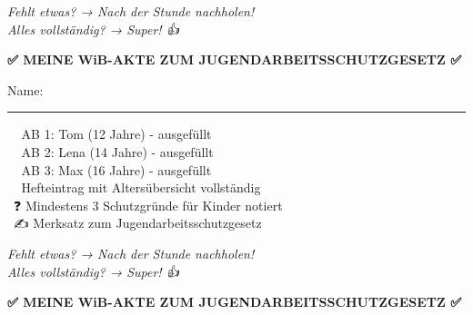 \documentclass[12pt, a4paper]{article}
\newcommand{\checkbox}{\framebox[1em]{\phantom{X}}}
\begin{document}
\begin{center}
\begin{minipage}{0.48\textwidth}
\begin{framed}
                \vspace{0.3cm}
                
                \textit{Fehlt etwas? → Nach der Stunde nachholen!}\\
                \textit{Alles vollständig? → Super! 👍}
            \end{framed}
        \end{minipage}
        
        \vspace{0.5cm}
        
        \begin{minipage}{0.48\textwidth}
            \begin{framed}
                \begin{center}
                    {\color{headercolor}\Large\textbf{✅ MEINE WiB-AKTE ZUM JUGENDARBEITSSCHUTZGESETZ ✅}}
                \end{center}
                
                Name: \rule{8cm}{0.4pt}
                
                \vspace{0.3cm}
                
                \checkbox\ 📄 AB 1: Tom (12 Jahre) - ausgefüllt\\
                \checkbox\ 📄 AB 2: Lena (14 Jahre) - ausgefüllt\\
                \checkbox\ 📄 AB 3: Max (16 Jahre) - ausgefüllt\\
                \checkbox\ 📝 Hefteintrag mit Altersübersicht vollständig\\
                \checkbox\ ❓ Mindestens 3 Schutzgründe für Kinder notiert\\
                \checkbox\ ✍️ Merksatz zum Jugendarbeitsschutzgesetz
                
                \vspace{0.3cm}
                
                \textit{Fehlt etwas? → Nach der Stunde nachholen!}\\
                \textit{Alles vollständig? → Super! 👍}
            \end{framed}
        \end{minipage}
        \hfill
        \begin{minipage}{0.48\textwidth}
            \begin{framed}
                \begin{center}
                    {\color{headercolor}\Large\textbf{✅ MEINE WiB-AKTE ZUM JUGENDARBEITSSCHUTZGESETZ ✅}}
                \end{center}
                

\end{framed}
\end{minipage}
\end{center}
\end{document}
